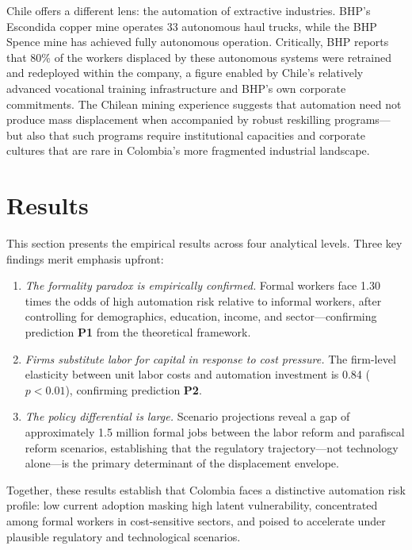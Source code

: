 \documentclass{article}
\begin{document}
Chile offers a different lens: the automation of extractive industries. BHP's Escondida copper mine operates 33 autonomous haul trucks, while the BHP Spence mine has achieved fully autonomous operation. Critically, BHP reports that 80\% of the workers displaced by these autonomous systems were retrained and redeployed within the company, a figure enabled by Chile's relatively advanced vocational training infrastructure and BHP's own corporate commitments. The Chilean mining experience suggests that automation need not produce mass displacement when accompanied by robust reskilling programs---but also that such programs require institutional capacities and corporate cultures that are rare in Colombia's more fragmented industrial landscape.


\FloatBarrier
\section{Results}
\label{sec:results}

This section presents the empirical results across four analytical levels. Three key findings merit emphasis upfront:

\begin{enumerate}[label=\textbf{Result \arabic*:}]
\item \textit{The formality paradox is empirically confirmed.} Formal workers face 1.30 times the odds of high automation risk relative to informal workers, after controlling for demographics, education, income, and sector---confirming prediction \textbf{P1} from the theoretical framework.
\item \textit{Firms substitute labor for capital in response to cost pressure.} The firm-level elasticity between unit labor costs and automation investment is 0.84 ($p < 0.01$), confirming prediction \textbf{P2}.
\item \textit{The policy differential is large.} Scenario projections reveal a gap of approximately 1.5 million formal jobs between the labor reform and parafiscal reform scenarios, establishing that the regulatory trajectory---not technology alone---is the primary determinant of the displacement envelope.
\end{enumerate}

\noindent Together, these results establish that Colombia faces a distinctive automation risk profile: low current adoption masking high latent vulnerability, concentrated among formal workers in cost-sensitive sectors, and poised to accelerate under plausible regulatory and technological scenarios.
\end{document}

